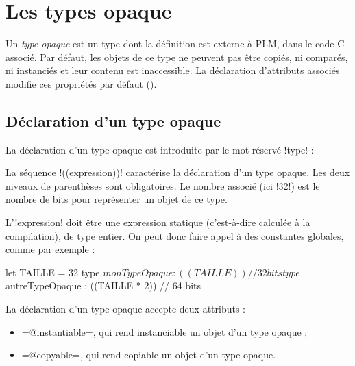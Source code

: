 




\chapter{Les types opaque}

Un \emph{type opaque} est un type dont la définition est externe à PLM, dans le code C associé. Par défaut, les objets de ce type ne peuvent pas être copiés, ni comparés, ni instanciés et leur contenu est inaccessible. La déclaration d'attributs associés modifie ces propriétés par défaut ().

\section{Déclaration d'un type opaque}

La déclaration d'un type opaque est introduite par le mot réservé \plm!type! :


La séquence \plm!((expression))! caractérise la déclaration d'un type opaque. Les deux niveaux de parenthèses sont obligatoires. Le nombre associé (ici \plm!32!) est le nombre de bits pour représenter un objet de ce type.

L'\plm!expression! doit être une expression statique (c'est-à-dire calculée à la compilation), de type entier. On peut donc faire appel à des constantes globales, comme par exemple :

\begin{PLM}
let TAILLE = 32
type $monTypeOpaque : ((TAILLE)) // 32 bits
type $autreTypeOpaque : ((TAILLE * 2)) // 64 bits
\end{PLM}






La déclaration d'un type opaque accepte deux attributs :
\begin{itemize}
\item \plm=@instantiable=, qui rend instanciable un objet d'un type opaque ;
\item \plm=@copyable=, qui rend copiable un objet d'un type opaque.
\end{itemize}

